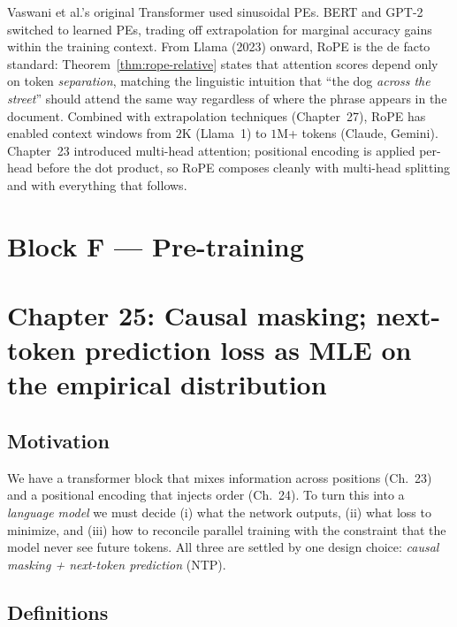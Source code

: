 \documentclass[11pt]{article}
\theoremstyle{remark}
\begin{document}
Vaswani et al.'s original Transformer used sinusoidal PEs. BERT and GPT-2 switched to learned PEs, trading off extrapolation for marginal accuracy gains within the training context. From Llama (2023) onward, RoPE is the de facto standard: Theorem~\ref{thm:rope-relative} states that attention scores depend only on token \emph{separation}, matching the linguistic intuition that ``the dog \emph{across the street}'' should attend the same way regardless of where the phrase appears in the document. Combined with extrapolation techniques (Chapter~27), RoPE has enabled context windows from $2$K (Llama~1) to $1$M+ tokens (Claude, Gemini). Chapter~23 introduced multi-head attention; positional encoding is applied per-head before the dot product, so RoPE composes cleanly with multi-head splitting and with everything that follows.



\section*{Block F --- Pre-training}

\section*{Chapter 25: Causal masking; next-token prediction loss as MLE on the empirical distribution}

\subsection*{Motivation}

We have a transformer block that mixes information across positions (Ch.~23) and a positional encoding that injects order (Ch.~24). To turn this into a \emph{language model} we must decide (i) what the network outputs, (ii) what loss to minimize, and (iii) how to reconcile parallel training with the constraint that the model never see future tokens. All three are settled by one design choice: \emph{causal masking + next-token prediction} (NTP).

\subsection*{Definitions}
\end{document}
